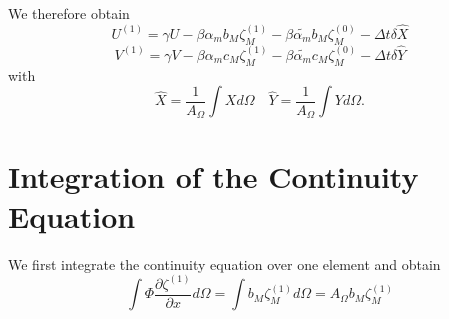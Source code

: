 \documentclass[12pt]{article}
\newcommand{\xdif}[1] {\frac{\partial #1}{\partial x}}
\newcommand{\dt} {\Delta t}
\newcommand{\AO} {A_{\Omega}}
\newcommand{\dO} {d \Omega}
\newcommand{\beq} {\begin{equation}}
\newcommand{\eeq} {\end{equation}}
\newcommand{\Unew} {U^{(1)}}
\newcommand{\Vnew} {V^{(1)}}
\newcommand{\zold} {\zeta^{(0)}}
\newcommand{\znew} {\zeta^{(1)}}
\newcommand{\Xb} {\hat{X}}
\newcommand{\Yb} {\hat{Y}}
\newcommand{\am} {\alpha_{m}}
\newcommand{\amt} {\tilde{\am}}
\begin{document}
We therefore obtain
\beq
\Unew = \gamma U 
		- \beta \am b_M \znew_M - \beta \amt b_M \zold_M 
		- \dt \delta \Xb
\eeq
\beq
\Vnew = \gamma V 
		- \beta \am c_M \znew_M - \beta \amt c_M \zold_M 
		- \dt \delta \Yb
\eeq
with
\beq
\Xb = \frac{1}{\AO} \int X \dO \quad
\Yb = \frac{1}{\AO} \int Y \dO.
\eeq


\section*{Integration of the Continuity Equation}

We first integrate the continuity equation over one element
and obtain
\beq
\int \Phi \xdif{\znew} \dO = \int b_M \znew_M \dO = \AO b_M \znew_M
\eeq
\end{document}
